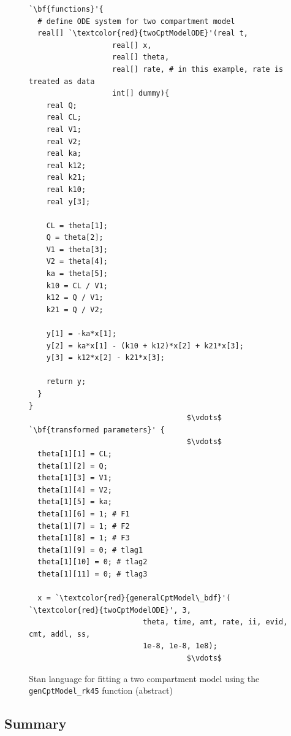 \documentclass[11pt]{amsart}
\newenvironment{fmpage}[1]
     {\begin{lrbox}{\fmbox}\begin{minipage}{#1}}
     {\end{minipage}\end{lrbox}\fbox{\usebox{\fmbox}}}
\begin{document}
\begin{figure}
\caption{Stan language for fitting a two compartment model using the \texttt{genCptModel\_rk45} function (abstract)}
\begin{center}
\begin{small}
\begin{fmpage}{\textwidth - .75in}
\begin{lstlisting}[basicstyle=\footnotesize\ttfamily,mathescape=true,flexiblecolumns=true,frame=single,escapeinside=`']
`\bf{functions}'{
  # define ODE system for two compartment model
  real[] `\textcolor{red}{twoCptModelODE}'(real t,
			       real[] x,
			       real[] theta,
			       real[] rate, # in this example, rate is treated as data
			       int[] dummy){
    real Q;
    real CL;
    real V1;
    real V2;
    real ka;
    real k12;
    real k21;
    real k10;
    real y[3]; 
    
    CL = theta[1];
    Q = theta[2];
    V1 = theta[3];
    V2 = theta[4];
    ka = theta[5];
    k10 = CL / V1;
    k12 = Q / V1;
    k21 = Q / V2;

    y[1] = -ka*x[1];
    y[2] = ka*x[1] - (k10 + k12)*x[2] + k21*x[3];
    y[3] = k12*x[2] - k21*x[3];

    return y;
  }
}
                                    $\vdots$
`\bf{transformed parameters}' {
                                    $\vdots$
  theta[1][1] = CL;
  theta[1][2] = Q;
  theta[1][3] = V1;
  theta[1][4] = V2;
  theta[1][5] = ka;
  theta[1][6] = 1; # F1
  theta[1][7] = 1; # F2
  theta[1][8] = 1; # F3
  theta[1][9] = 0; # tlag1
  theta[1][10] = 0; # tlag2
  theta[1][11] = 0; # tlag3

  x = `\textcolor{red}{generalCptModel\_bdf}'( `\textcolor{red}{twoCptModelODE}', 3,
                          theta, time, amt, rate, ii, evid, cmt, addl, ss,
                          1e-8, 1e-8, 1e8);
                                    $\vdots$
\end{lstlisting}
\end{fmpage}
\end{small}
\end{center}
\label{example1.1Model}
\end{figure}

\subsection*{Summary}
\end{document}
